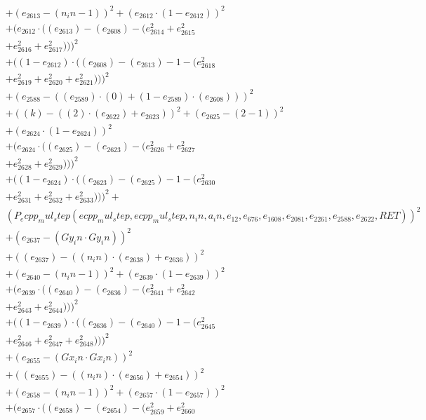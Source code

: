 \documentclass[10pt, a4paper]{article}
\begin{document}
\begin{align*}
& + (e_{2613} - (n_in - 1))^{2} + (e_{2612}  \cdot  (1 - e_{2612}))^{2} \\
& + (e_{2612}  \cdot  ((e_{2613}) - (e_{2608}) - (e_{2614}^{2} + e_{2615}^{2} \\
& + e_{2616}^{2} + e_{2617}^{2})))^{2} \\
& + ((1 - e_{2612})  \cdot  ((e_{2608}) - (e_{2613}) - 1 - (e_{2618}^{2} \\
& + e_{2619}^{2} + e_{2620}^{2} + e_{2621}^{2})))^{2} \\
& + (e_{2588} - ((e_{2589})  \cdot  (0) + (1 - e_{2589})  \cdot  (e_{2608})))^{2} \\
& + ((k) - ((2)  \cdot  (e_{2622}) + e_{2623}))^{2} + (e_{2625} - (2 - 1))^{2} \\
& + (e_{2624}  \cdot  (1 - e_{2624}))^{2} \\
& + (e_{2624}  \cdot  ((e_{2625}) - (e_{2623}) - (e_{2626}^{2} + e_{2627}^{2} \\
& + e_{2628}^{2} + e_{2629}^{2})))^{2} \\
& + ((1 - e_{2624})  \cdot  ((e_{2623}) - (e_{2625}) - 1 - (e_{2630}^{2} \\
& + e_{2631}^{2} + e_{2632}^{2} + e_{2633}^{2})))^{2} + \\
& (P_ecpp_mul_step(ecpp_mul_step, ecpp_mul_step, n_in, a_in, e_{12}, e_{676}, e_{1608}, e_{2081}, e_{2261}, e_{2588}, e_{2622}, RET))^{2} \\
& + (e_{2637} - (Gy_in  \cdot  Gy_in))^{2} \\
& + ((e_{2637}) - ((n_in)  \cdot  (e_{2638}) + e_{2636}))^{2} \\
& + (e_{2640} - (n_in - 1))^{2} + (e_{2639}  \cdot  (1 - e_{2639}))^{2} \\
& + (e_{2639}  \cdot  ((e_{2640}) - (e_{2636}) - (e_{2641}^{2} + e_{2642}^{2} \\
& + e_{2643}^{2} + e_{2644}^{2})))^{2} \\
& + ((1 - e_{2639})  \cdot  ((e_{2636}) - (e_{2640}) - 1 - (e_{2645}^{2} \\
& + e_{2646}^{2} + e_{2647}^{2} + e_{2648}^{2})))^{2} \\
& + (e_{2655} - (Gx_in  \cdot  Gx_in))^{2} \\
& + ((e_{2655}) - ((n_in)  \cdot  (e_{2656}) + e_{2654}))^{2} \\
& + (e_{2658} - (n_in - 1))^{2} + (e_{2657}  \cdot  (1 - e_{2657}))^{2} \\
& + (e_{2657}  \cdot  ((e_{2658}) - (e_{2654}) - (e_{2659}^{2} + e_{2660}^{2} \\

\end{align*}
\end{document}
